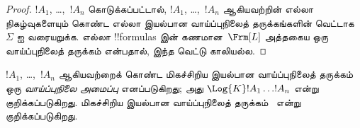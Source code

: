 \documentclass[../../../include/open-logic-section]{subfiles}
\begin{document}
\begin{proof}
  $!A_1$, \dots,~$!A_n$ கொடுக்கப்பட்டால், $!A_1$, \dots,~$!A_n$
  ஆகியவற்றின் எல்லா நிகழ்வுகளையும் கொண்ட எல்லா இயல்பான வாய்ப்புநிலைத்
  தருக்கங்களின் வெட்டாக~$\Sigma$ ஐ வரையறுக்க. எல்லா !!{formula}s இன்
  கணமான~$\Frm[L]$ அத்தகைய ஒரு
  வாய்ப்புநிலைத் தருக்கம் என்பதால், இந்த வெட்டு காலியல்ல.
\end{proof}

\begin{defn}
$!A_1$, \dots,~$!A_n$ ஆகியவற்றைக் கொண்ட மிகச்சிறிய இயல்பான வாய்ப்புநிலைத்
தருக்கம் ஒரு \emph{வாய்ப்புநிலை அமைப்பு} எனப்படுகிறது; அது
$\Log{K} !A_1 \dots !A_n$ என்று குறிக்கப்படுகிறது. மிகச்சிறிய இயல்பான
வாய்ப்புநிலைத் தருக்கம்~ என்று குறிக்கப்படுகிறது.
\end{defn}
\end{document}
